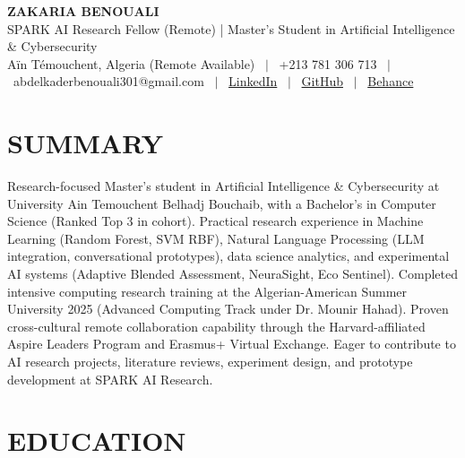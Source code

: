 \documentclass[10.5pt, letterpaper]{article}
\begin{document}
\RaggedRight

\begin{center}
  {\Huge \textbf{ZAKARIA BENOUALI}}\\[4pt]
  {\large SPARK AI Research Fellow (Remote) | Master's Student in Artificial Intelligence \& Cybersecurity}\\[4pt]
  Aïn Témouchent, Algeria (Remote Available) \ $|$ \ +213 781 306 713 \ $|$ \ abdelkaderbenouali301@gmail.com \ $|$ \ \href{https://www.linkedin.com/in/benouali-abdelkader-yahia-zakaria-4a917a247}{LinkedIn} \ $|$ \ \href{https://github.com/benoualiabdelkader}{GitHub} \ $|$ \ \href{https://www.behance.net/abdelkaderbeno}{Behance}
\end{center}

\vspace{2pt}

\section{SUMMARY}
Research-focused Master's student in Artificial Intelligence \& Cybersecurity at University Ain Temouchent Belhadj Bouchaib, with a Bachelor's in Computer Science (Ranked Top 3 in cohort). Practical research experience in Machine Learning (Random Forest, SVM RBF), Natural Language Processing (LLM integration, conversational prototypes), data science analytics, and experimental AI systems (Adaptive Blended Assessment, NeuraSight, Eco Sentinel). Completed intensive computing research training at the Algerian-American Summer University 2025 (Advanced Computing Track under Dr. Mounir Hahad). Proven cross-cultural remote collaboration capability through the Harvard-affiliated Aspire Leaders Program and Erasmus+ Virtual Exchange. Eager to contribute to AI research projects, literature reviews, experiment design, and prototype development at SPARK AI Research.

\section{EDUCATION}
\end{document}
